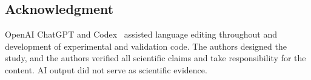 \documentclass[conference]{IEEEtran}
\newcommand{\actionrev}[1]{#1}
\begin{document}
\begin{samepage}
\section*{Acknowledgment}
\actionrev{OpenAI ChatGPT and Codex~\cite{openai2026chatgpt} assisted language
editing throughout and development of experimental and validation code. The
authors designed the study, and the authors verified all scientific claims and
take responsibility for the content. AI output did not serve as scientific
evidence.}
\end{samepage}



\end{document}
